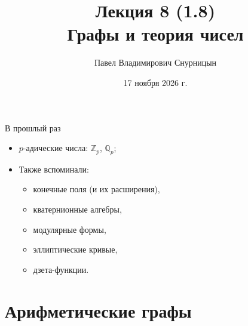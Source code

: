 \documentclass[serif, aspectratio=169]{beamer}
\author{Павел Владимирович Снурницын}
\title{Лекция 8 (1.8)\\ Графы и теория чисел}
\institute{к.ф.-м.н., с.н.с., ИБ ВМК}
\date{\small 17 ноября 2026 г.}
\begin{document}
\begin{frame}
    \titlepage
\end{frame}
\note{}

\begin{frame}{В прошлый раз}
    \begin{itemize}
        \item $p$-адические числа: $\mathbb{Z}_p$, $\mathbb{Q}_p$;
        \item Также вспоминали:
        \begin{itemize}[<.->]
            \item конечные поля (и их расширения),
            \item кватернионные алгебры,
            \item модулярные формы,
            \item эллиптические кривые,
            \item дзета-функции.
        \end{itemize}
    \end{itemize}
    \note{
        \begin{itemize}
            \item ---
        \end{itemize}
    }
\end{frame}

\section{Арифметические графы}
\end{document}
